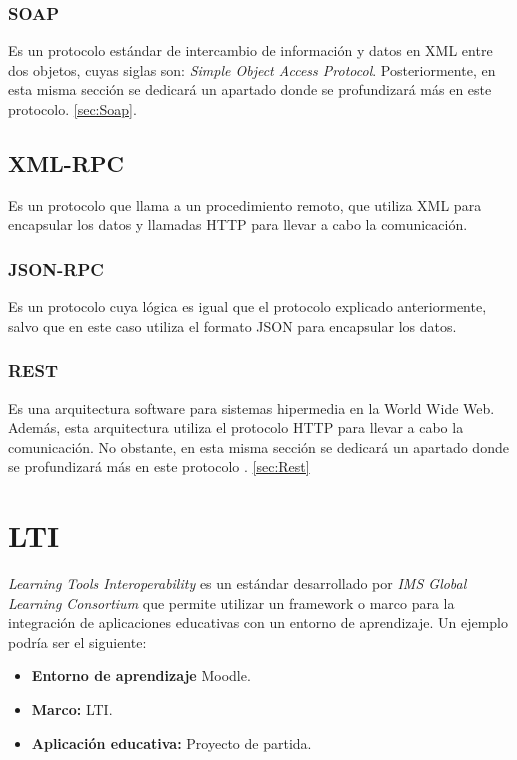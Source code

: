 \subsubsection{SOAP}

Es un protocolo estándar de intercambio de información y datos en XML entre dos objetos, cuyas siglas son: \emph{Simple Object Access Protocol}. Posteriormente, en esta misma sección se dedicará un apartado donde se profundizará más en este protocolo.  \ref{sec:Soap}.

\subsection{XML-RPC}

Es un protocolo que llama a un procedimiento remoto, que utiliza XML para encapsular los datos y llamadas HTTP para llevar a cabo la comunicación.

\subsubsection{JSON-RPC}

Es un protocolo cuya lógica es igual que el protocolo explicado anteriormente, salvo que en este caso utiliza el formato JSON para encapsular los datos.

\subsubsection{REST}

Es una arquitectura software para sistemas hipermedia en la World Wide Web. Además, esta arquitectura utiliza el protocolo HTTP para llevar a cabo la comunicación. No obstante, en esta misma sección se dedicará un apartado donde se profundizará más en este protocolo \cite{wiki:rest}. \ref{sec:Rest}


\section{LTI}\label{subsec:LTI}

\emph{Learning Tools Interoperability} es un estándar desarrollado por \emph{IMS Global Learning Consortium} que permite utilizar un framework o marco para la integración de aplicaciones educativas con un entorno de aprendizaje.
Un ejemplo podría ser el siguiente:

\begin{itemize}
	\item \textbf{Entorno de aprendizaje} Moodle.
	\item \textbf{Marco:} LTI.
	\item \textbf{Aplicación educativa:} Proyecto de partida.
\end{itemize}

